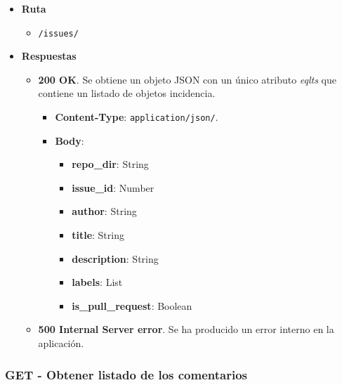 \begin{itemize}
    \item[] \textbf{Ruta}
        \begin{itemize} \setlength\itemsep{0.2em}
            \item[] \texttt{/issues/}
        \end{itemize}
    \item[] \textbf{Respuestas}
        \begin{itemize} \setlength\itemsep{0.2em}
            \item[] \textbf{200 OK}. Se obtiene un objeto JSON con un único atributo \textit{eqlts} que contiene un listado de objetos incidencia.
                \begin{itemize} \setlength\itemsep{0.2em}
                    \item[] \textbf{Content-Type}: \texttt{application/json/}.
                    \item[] \textbf{Body}: 
                        \begin{itemize} \setlength\itemsep{0.2em}
                            \item[] \textbf{repo\_dir}: String
                            \item[] \textbf{issue\_id}: Number
                            \item[] \textbf{author}: String
                            \item[] \textbf{title}: String
                            \item[] \textbf{description}: String
                            \item[] \textbf{labels}: List
                            \item[] \textbf{is\_pull\_request}: Boolean
                        \end{itemize}
                \end{itemize}
            \item[] \textbf{500 Internal Server error}. Se ha producido un error interno en la aplicación.
        \end{itemize}
\end{itemize}

\subsubsection{GET - Obtener listado de los comentarios}

